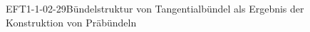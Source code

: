 
\begin{EXA}{EFT1-1-02-29}{Bündelstruktur von Tangentialbündel als Ergebnis der Konstruktion von Präbündeln}
\end{EXA}
